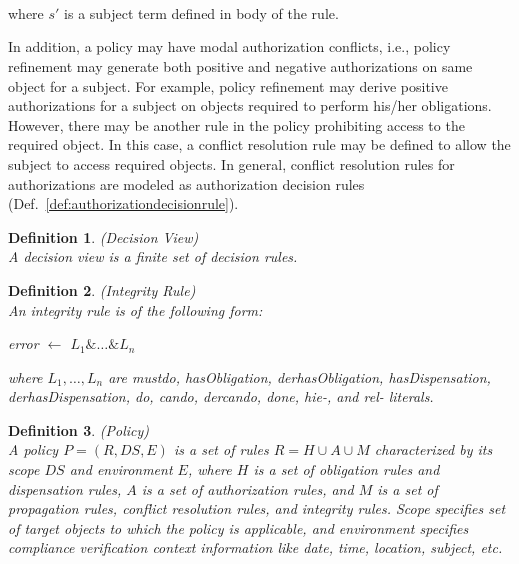 \documentclass[12pt,journal,letterpaper,onecolumn]{IEEEtran}
\newtheorem{definition}{Definition}[section]
\begin{document}
 \\
 \\
\\
where $s'$ is a subject term defined in body of the rule.

In addition, a policy may have modal authorization conflicts, i.e.,
policy refinement may generate both positive and negative
authorizations on same object for a subject. For example, policy
refinement may derive positive authorizations for a subject on
objects required to perform his/her obligations. However, there may
be another rule in the policy prohibiting access to the required
object. In this case, a conflict resolution rule may be defined to
allow the subject to access required objects. In general, conflict
resolution rules for authorizations are modeled as authorization
decision rules (Def.~\ref{def:authorizationdecisionrule}).


\begin{definition}(Decision View)\\
A decision view is a finite set of decision rules.
\end{definition}


\begin{definition}(Integrity Rule)\\
An integrity rule is of the following form:
\begin{center}
{\ttfamily error $\leftarrow$ $L_1\&\ldots\&L_n$}
\end{center}
where $L_1,\ldots,L_n$ are mustdo, hasObligation, derhasObligation,
hasDispensation, derhasDispensation, do, cando, dercando, done,
hie-, and rel- literals.
\end{definition}

\begin{definition}(Policy) \\
\noindent A {\em policy} $P = (R,DS,E)$ is a set of rules $R = H
\cup A \cup M$ characterized by its scope $DS$ and environment $E$,
where $H$ is a set of obligation rules and dispensation rules, $A$
is a set of authorization rules, and $M$ is a set of propagation
rules, conflict resolution rules, and integrity rules. Scope
specifies set of target objects to which the policy is applicable,
and environment specifies compliance verification context
information like date, time, location, subject, etc.
\label{def:policy}
\end{definition}
\end{document}
